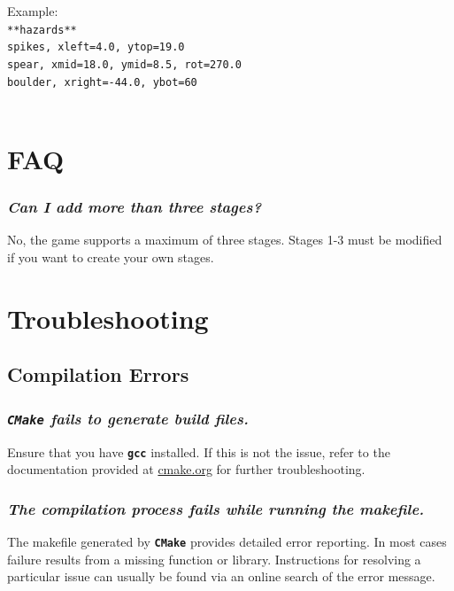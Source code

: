 \documentclass[12pt, titlepage]{article}
\begin{document}
\noindent Example:\\

\noindent ${}$\qquad \texttt{**hazards**}\\
${}$\qquad \texttt{spikes, xleft=4.0, ytop=19.0}\\
${}$\qquad \texttt{spear, xmid=18.0, ymid=8.5, rot=270.0}\\
${}$\qquad \texttt{boulder, xright=-44.0, ybot=60}\\\\


\section{FAQ}


\label{sec:faq}

\subsubsection{\emph{Can I add more than three stages?}}
\noindent No, the game supports a maximum of three stages.  Stages 1-3 must be modified if you want to create your own stages.

\section{Troubleshooting}
\label{sec:trouble}
\subsection{Compilation Errors}
\subsubsection{\emph{\texttt{CMake} fails to generate build files.}}
\noindent Ensure that you have \texttt{\bf gcc} installed.  If this is not the issue, refer to the documentation provided at \href{http://www.cmake.org}{cmake.org} for further troubleshooting.

\subsubsection{\emph{The compilation process fails while running the makefile.}}
\noindent The makefile generated by \texttt{\bf CMake} provides detailed error reporting.  In most cases failure results from a missing function or library.  Instructions for resolving a particular issue can usually be found via an online search of the error message.
\end{document}
